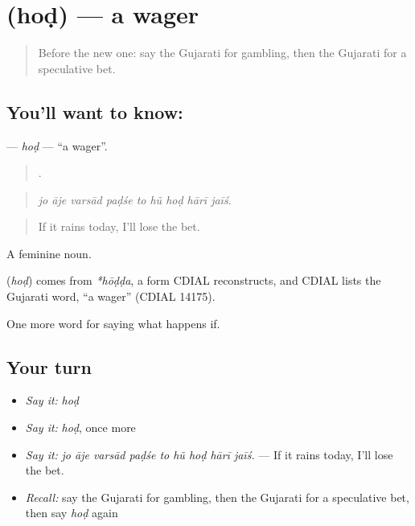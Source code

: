 \section[\texorpdfstring{\gu{હોડ} (hoḍ)}{હોડ (hoḍ)}]{ (hoḍ) — a wager}

\label{lesson:GU-C534-hod}



\begin{quote}
Before the new one: say the Gujarati for gambling, then the Gujarati for a speculative bet.
\end{quote}

\subsection*{You'll want to know: }
\textbf{} — \emph{hoḍ} — \textquotedblleft{}a wager\textquotedblright{}.

\begin{quote}
        .
\end{quote}

\begin{quote}
\emph{jo āje varsād paḍśe to hũ hoḍ hārī jaīś.}
\end{quote}

\begin{quote}
If it rains today, I'll lose the bet.
\end{quote}

A feminine noun.

\begin{cousinweb}
\textbf{} (\emph{hoḍ}) comes from \emph{*hōḍḍa}, a form CDIAL reconstructs, and CDIAL lists the Gujarati word, \textquotedblleft{}a wager\textquotedblright{} (CDIAL 14175).
\end{cousinweb}

\begin{grammarlens}[title={What you've built}]
One more word for saying what happens if.
\end{grammarlens}

\subsection*{Your turn}
\begin{itemize}
\raggedright
  \item \emph{Say it:} \emph{hoḍ}
  \item \emph{Say it:} \emph{hoḍ}, once more
  \item \emph{Say it:} \emph{jo āje varsād paḍśe to hũ hoḍ hārī jaīś.} — If it rains today, I'll lose the bet.
  \item \emph{Recall:} say the Gujarati for gambling, then the Gujarati for a speculative bet, then say \emph{hoḍ} again
\end{itemize}

